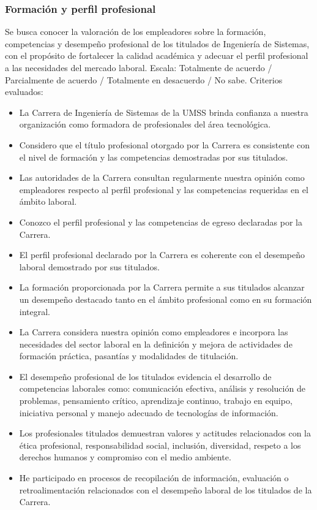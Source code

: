 \documentclass[12pt]{article}
\begin{document}
\subsubsection*{Formación y perfil profesional}

Se busca conocer la valoración de los empleadores sobre la formación,
competencias y desempeño profesional de los titulados de Ingeniería de
Sistemas, con el propósito de fortalecer la calidad académica y adecuar
el perfil profesional a las necesidades del mercado laboral. Escala:
Totalmente de acuerdo / Parcialmente de acuerdo / Totalmente en
desacuerdo / No sabe. Criterios evaluados:

\begin{itemize}[nosep]
    \item La Carrera de Ingeniería de Sistemas de la UMSS brinda
    confianza a nuestra organización como formadora de profesionales del
    área tecnológica.
    \item Considero que el título profesional otorgado por la Carrera es
    consistente con el nivel de formación y las competencias demostradas
    por sus titulados.
    \item Las autoridades de la Carrera consultan regularmente nuestra
    opinión como empleadores respecto al perfil profesional y las
    competencias requeridas en el ámbito laboral.
    \item Conozco el perfil profesional y las competencias de egreso
    declaradas por la Carrera.
    \item El perfil profesional declarado por la Carrera es coherente con
    el desempeño laboral demostrado por sus titulados.
    \item La formación proporcionada por la Carrera permite a sus
    titulados alcanzar un desempeño destacado tanto en el ámbito
    profesional como en su formación integral.
    \item La Carrera considera nuestra opinión como empleadores e
    incorpora las necesidades del sector laboral en la definición y
    mejora de actividades de formación práctica, pasantías y modalidades
    de titulación.
    \item El desempeño profesional de los titulados evidencia el
    desarrollo de competencias laborales como: comunicación efectiva,
    análisis y resolución de problemas, pensamiento crítico, aprendizaje
    continuo, trabajo en equipo, iniciativa personal y manejo adecuado de
    tecnologías de información.
    \item Los profesionales titulados demuestran valores y actitudes
    relacionados con la ética profesional, responsabilidad social,
    inclusión, diversidad, respeto a los derechos humanos y compromiso
    con el medio ambiente.
    \item He participado en procesos de recopilación de información,
    evaluación o retroalimentación relacionados con el desempeño laboral
    de los titulados de la Carrera.
\end{itemize}
\end{document}
